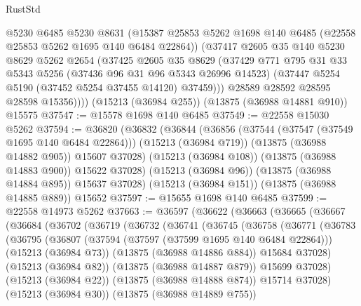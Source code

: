 \begin{lexlean}{RustStd}
\begin{coremodule}
          @5230
          @6485
          @5230
          @8631
          (@15387 @25853 @5262 @1698 @140 @6485 (@22558 @25853 @5262 @1695 @140 @6484 @22864))
          (@37417
            @2605
            @35
            @140
            @5230
            @8629
            @5262
            @2654
            (@37425
              @2605
              @35
              @8629
              (@37429
                @771
                @795
                @31
                @33
                @5343
                @5256
                (@37436 @96 @31 @96 @5343 @26996 @14523)
                (@37447 @5254 @5190 (@37452 @5254 @37455 @14120) @37459)))
            @28589
            @28592
            @28595
            @28598
            @15356))))
    (@15213 (@36984 @255))
    (@13875 (@36988 @14881 @910))
    @15575
@37547 := @15578 @1698 @140 @6485
@37549 := @22558 @15030 @5262
@37594 := @36820
    (@36832
      (@36844
        (@36856
          (@37544 (@37547 (@37549 @1695 @140 @6484 @22864)))
          (@15213 (@36984 @719))
          (@13875 (@36988 @14882 @905))
          @15607
          @37028)
        (@15213 (@36984 @108))
        (@13875 (@36988 @14883 @900))
        @15622
        @37028)
      (@15213 (@36984 @96))
      (@13875 (@36988 @14884 @895))
      @15637
      @37028)
    (@15213 (@36984 @151))
    (@13875 (@36988 @14885 @889))
    @15652
@37597 := @15655 @1698 @140 @6485
@37599 := @22558 @14973 @5262
@37663 := @36597
    (@36622
      (@36663
        (@36665
          (@36667
            (@36684
              (@36702
                (@36719
                  (@36732
                    (@36741
                      (@36745
                        (@36758
                          (@36771
                            (@36783
                              (@36795
                                (@36807
                                  (@37594 (@37597 (@37599 @1695 @140 @6484 @22864)))
                                  (@15213 (@36984 @73))
                                  (@13875 (@36988 @14886 @884))
                                  @15684
                                  @37028)
                                (@15213 (@36984 @82))
                                (@13875 (@36988 @14887 @879))
                                @15699
                                @37028)
                              (@15213 (@36984 @22))
                              (@13875 (@36988 @14888 @874))
                              @15714
                              @37028)
                            (@15213 (@36984 @30))
                            (@13875 (@36988 @14889 @755))

\end{coremodule}
\end{lexlean}
